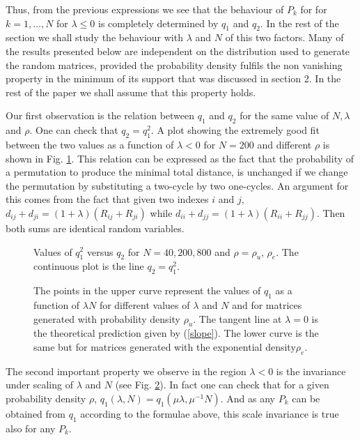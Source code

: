 \documentclass[]{iopart}
\begin{document}
Thus, from the previous expressions
we see that the behaviour of $P_k$ for for $k=1,\dots, N$  
for $\lambda\leq0$
is completely determined by $q_1$ and $q_2$. In the rest of the section 
we shall study the behaviour with $\lambda$ and $N$ of this two factors.
Many of the results presented below
are independent on the distribution 
used to generate the random matrices, provided
the probability density fulfils the non vanishing
property in the minimum  of its support that was discussed
in section 2. In the rest of the paper we shall assume that this property
holds.

Our first observation is the relation between $q_1$ and 
$q_2$ for the same value of $N, \lambda$ and $\rho$.
One can check that $q_2=q_1^2$.
A plot showing the extremely good fit between the two values as a function of
$\lambda<0$ for $N=200$ and different $\rho$ is shown in Fig. \ref{q1q2}.
This relation can be expressed as the fact that the probability of
a permutation to produce the minimal total distance,
is unchanged if we change the permutation by substituting 
a two-cycle by two one-cycles. 
An argument for this comes from the fact
that given two indexes $i$ and $j$, $d_{{i}{j}}+d_{{j}{i}}=
(1+\lambda)(R_{{i}{j}}+R_{{j}{i}})$ while 
$d_{{i}{i}}+d_{{j}{j}}=(1+\lambda)(R_{{i}{i}}+R_{{j}{j}})$. Then both
sums are identical random variables.
\begin{figure}[h!]
\caption{\small Values of $q_1^2$ versus $q_2$ for $N=40, 200, 800$ and
 $\rho=\rho_u$, $\rho_e$. The continuous plot is the line $q_2=q_1^2$.}
\label{q1q2}
\end{figure}


\begin{figure}[h!]
\caption{\small The points in the upper curve represent the  values of $q_1$ 
as a function of $\lambda N$ for different values of $\lambda$
 and $N$ and for matrices generated with probability density $\rho_u$. The 
 tangent line at $\lambda =0$ is the  theoretical prediction given by
 (\ref{slope}). The lower curve is the same
 but for matrices generated with the exponential density$\rho_e$.}
\label{q1}
\end{figure}
The second important property we observe in the region $\lambda<0$ 
is the invariance under scaling of $\lambda$ and $N$ (see Fig. \ref{q1}). In fact 
one can check that for a given probability density $\rho$, 
$q_1(\lambda,N)=q_1(\mu\lambda, \mu^{-1}N)$.
And as any $P_k$ can be obtained
from $q_1$ according to the formulae above, this 
scale invariance is true also for any $P_k$.
\end{document}
